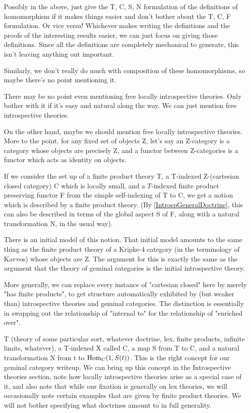 \begin{TODOblock}
Possibly in the above, just give the T, C, S, N formulation of the definitions of homomorphism if it makes things easier and don't bother about the T, C, F formulation. Or vice versa! Whichever makes writing the definitions and the proofs of the interesting results easier, we can just focus on giving those definitions. Since all the definitions are completely mechanical to generate, this isn't leaving anything out important.

Similarly, we don't really do much with composition of these homomorphisms, so maybe there's no point mentioning it.

There may be no point even mentioning free locally introspective theories. Only bother with it if it's easy and natural along the way. We can just mention free introspective theories.
\end{TODOblock}

\begin{TODOblock}
On the other hand, maybe we should mention free locally introspective theories. More to the point, for any fixed set of objects Z, let's say an Z-category is a category whose objects are precisely Z, and a functor between Z-categories is a functor which acts as identity on objects.

If we consider the set up of a finite product theory T, a T-indexed Z-(cartesian closed category) C which is locally small, and a $T$-indexed finite product preserving functor F from the simple self-indexing of T to C, we get a notion which is described by a finite product theory. (By \cref{IntrospGeneralDoctrine}, this can also be described in terms of the global aspect S of F, along with a natural transformation N, in the usual way).

There is an initial model of this notion. That initial model amounts to the same thing as the finite product theory of a Kripke-4 category (in the terminology of Kavvos) whose objects are Z. The argument for this is exactly the same as the argument that the theory of geminal categories is the initial introspective theory.

More generally, we can replace every instance of "cartesian closed" here by merely "has finite products", to get structure automatically exhibited by (but weaker than) introspective theories and geminal categories. The distinction is essentially in swapping out the relationship of "internal to" for the relationship of "enriched over".

T (theory of some particular sort, whatever doctrine, lex, finite products, infinite limits, whatever), a T-indexed X called C, a map S from T to C, and a natural transformation N from t to $\operatorname{Hom}_C(1, S(t))$. This is the right concept for our geminal category writeup. We can bring up this concept in the Introspective theories section, note how locally introspective theories arise as a special case of it, and also note that while our fixation is generally on lex theories, we will occasionally note certain examples that are given by finite product theories. We will not bother specifying what doctrines amount to in full generality.
\end{TODOblock}